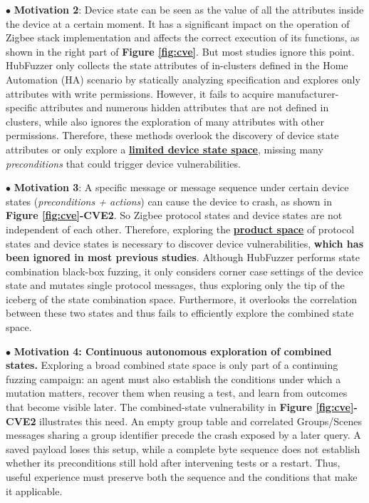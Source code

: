 \documentclass[10pt,journal,compsoc]{IEEEtran}
\begin{document}
\noindent $\bullet$ \textbf{Motivation 2}: Device state can be seen as the value of all the attributes inside the device at a certain moment. It has a significant impact on the operation of Zigbee stack implementation and affects the correct execution of its functions, as shown in the right part of \textbf{Figure \ref{fig:cve}}. But most studies \cite{ren2021z, meng2024large, wang2024llmif, redini2021diane, wang2022don, chen2019exploring, de2015protocol, fiterau2020analysis} ignore this point. HubFuzzer only collects the state attributes of in-clusters defined in the Home Automation (HA) scenario by statically analyzing specification and explores only attributes with write permissions. However, it fails to acquire manufacturer-specific attributes and numerous hidden attributes that are not defined in clusters, while also ignores the exploration of many attributes with other permissions. Therefore, these methods overlook the discovery of device state attributes or only explore a \textbf{\underline{limited device state space}}, missing many \textit{preconditions} that could trigger device vulnerabilities.\\ \vspace{-0.2cm}

\noindent $\bullet$ \textbf{Motivation 3}: A specific message or message sequence under certain device states (\textit{preconditions + actions}) can cause the device to crash, as shown in \textbf{Figure \ref{fig:cve}-CVE2}. So Zigbee protocol states and device states are not independent of each other. Therefore, exploring the \textbf{\underline{product space}} of protocol states and device states is necessary to discover device vulnerabilities, \textbf{which has been ignored in most previous studies}. Although HubFuzzer performs state combination black-box fuzzing, it only considers corner case settings of the device state and mutates single protocol messages, thus exploring only the tip of the iceberg of the state combination space. Furthermore, it overlooks the correlation between these two states and thus fails to efficiently explore the combined state space.

\noindent $\bullet$ \textbf{Motivation 4: Continuous autonomous exploration of combined states.}\label{motivation4}
Exploring a broad combined state space is only part of a continuing fuzzing campaign: an agent must also establish the conditions under which a mutation matters, recover them when reusing a test, and learn from outcomes that become visible later. The combined-state vulnerability in \textbf{Figure \ref{fig:cve}-CVE2} illustrates this need. An empty group table and correlated Groups/Scenes messages sharing a group identifier precede the crash exposed by a later query. A saved payload loses this setup, while a complete byte sequence does not establish whether its preconditions still hold after intervening tests or a restart. Thus, useful experience must preserve both the sequence and the conditions that make it applicable.
\end{document}
